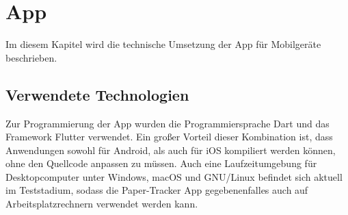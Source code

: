 \section{App}

Im diesem Kapitel wird die technische Umsetzung der App für Mobilgeräte beschrieben.

\subsection{Verwendete Technologien}

Zur Programmierung der App wurden die Programmiersprache Dart und das Framework Flutter verwendet.
Ein großer Vorteil dieser Kombination ist, dass Anwendungen sowohl für Android, als auch für iOS
kompiliert werden können, ohne den Quellcode anpassen zu müssen. Auch eine Laufzeitumgebung für
Desktopcomputer unter Windows, macOS und GNU/Linux befindet sich aktuell im Teststadium, sodass die
Paper-Tracker App gegebenenfalles auch auf Arbeitsplatzrechnern verwendet werden kann.

